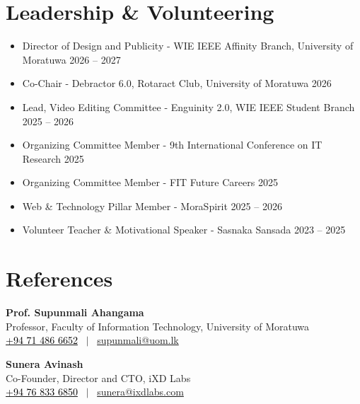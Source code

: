\documentclass[10pt,a4paper]{article}
\begin{document}
\section{Leadership \& Volunteering}

\begin{itemize}

    \item Director of Design and Publicity - WIE IEEE Affinity Branch,
    University of Moratuwa \hfill 2026 -- 2027

    \item Co-Chair - Debractor 6.0, Rotaract Club,
    University of Moratuwa \hfill 2026

    \item Lead, Video Editing Committee - Enguinity 2.0,
    WIE IEEE Student Branch \hfill 2025 -- 2026

    \item Organizing Committee Member - 9th International Conference
    on IT Research \hfill 2025

    \item Organizing Committee Member - FIT Future Careers
    \hfill 2025

    \item Web \& Technology Pillar Member - MoraSpirit
    \hfill 2025 -- 2026

    \item Volunteer Teacher \& Motivational Speaker - Sasnaka Sansada
    \hfill 2023 -- 2025

\end{itemize}

\section{References}

\noindent
\textbf{Prof. Supunmali Ahangama}\\
Professor, Faculty of Information Technology, University of Moratuwa\\
\href{tel:+94714866652}
{\textcolor{black}{+94 71 486 6652}}
\ $|$ \
\href{mailto:supunmali@uom.lk}
{supunmali@uom.lk}

\vspace{4pt}

\noindent
\textbf{Sunera Avinash}\\
Co-Founder, Director and CTO, iXD Labs\\
\href{tel:+94768336850}
{\textcolor{black}{+94 76 833 6850}}
\ $|$ \
\href{mailto:sunera@ixdlabs.com}
{sunera@ixdlabs.com}
\end{document}
